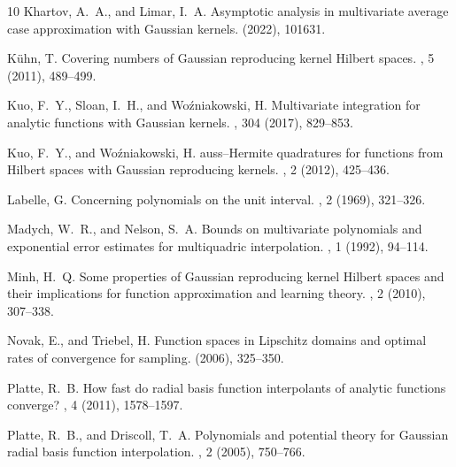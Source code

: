 \documentclass{mcom-l}
\numberwithin{equation}{section}
\numberwithin{theorem}{section} %
\begin{document}
\begin{thebibliography}{10}
{\sc Khartov, A.~A., and Limar, I.~A.}
\newblock Asymptotic analysis in multivariate average case approximation with
  {G}aussian kernels.
 (2022), 101631.

{\sc K{\"u}hn, T.}
\newblock Covering numbers of {G}aussian reproducing kernel {H}ilbert spaces.
, 5 (2011), 489--499.

{\sc Kuo, F.~Y., Sloan, I.~H., and Wo{\'z}niakowski, H.}
\newblock Multivariate integration for analytic functions with {G}aussian
  kernels.
, 304 (2017), 829--853.

{\sc Kuo, F.~Y., and Woźniakowski, H.}
auss--{H}ermite quadratures for functions from {H}ilbert spaces
  with {G}aussian reproducing kernels.
, 2 (2012), 425--436.

{\sc Labelle, G.}
\newblock Concerning polynomials on the unit interval.
, 2 (1969),
  321--326.

{\sc Madych, W.~R., and Nelson, S.~A.}
\newblock Bounds on multivariate polynomials and exponential error estimates
  for multiquadric interpolation.
, 1 (1992), 94--114.

{\sc Minh, H.~Q.}
\newblock Some properties of {G}aussian reproducing kernel {H}ilbert spaces and
  their implications for function approximation and learning theory.
, 2 (2010), 307--338.

{\sc Novak, E., and Triebel, H.}
\newblock Function spaces in {L}ipschitz domains and optimal rates of
  convergence for sampling.
 (2006), 325--350.

{\sc Platte, R.~B.}
\newblock How fast do radial basis function interpolants of analytic functions
  converge?
, 4 (2011), 1578--1597.

{\sc Platte, R.~B., and Driscoll, T.~A.}
\newblock Polynomials and potential theory for {G}aussian radial basis function
  interpolation.
, 2 (2005), 750--766.


\end{thebibliography}
\end{document}
